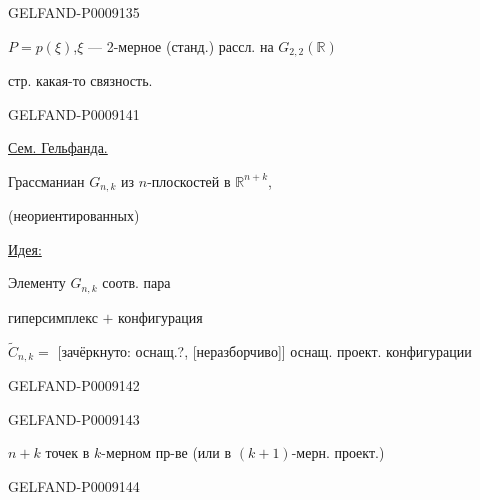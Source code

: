 \begin{GelfandAdjacentEvidence}{GELFAND-P000913}{5}


$P=p(\xi)$,\qquad $\xi$ --- 2-мерное (станд.) рассл. на $G_{2,2}(\mathbb R)$

стр. какая-то связность.
\end{GelfandAdjacentEvidence}



\begin{GelfandAdjacentEvidence}{GELFAND-P000914}{1}

\qquad\uline{Сем. Гельфанда.}


Грассманиан $G_{n,k}$ из $n$-плоскостей в $\mathbb R^{n+k}$,

(неориентированных)

\uline{Идея:}

Элементу $G_{n,k}$ соотв. пара

гиперсимплекс $+$ конфигурация

\(\widetilde C_{n,k}=\) [зачёркнуто: оснащ.?, [неразборчиво]] оснащ. проект. конфигурации
\end{GelfandAdjacentEvidence}
\begin{GelfandAdjacentEvidence}{GELFAND-P000914}{2}


\end{GelfandAdjacentEvidence}
\begin{GelfandAdjacentEvidence}{GELFAND-P000914}{3}


$n+k$ точек в $k$-мерном пр-ве (или в $(k+1)$-мерн. проект.)
\end{GelfandAdjacentEvidence}
\begin{GelfandAdjacentEvidence}{GELFAND-P000914}{4}


\end{GelfandAdjacentEvidence}



